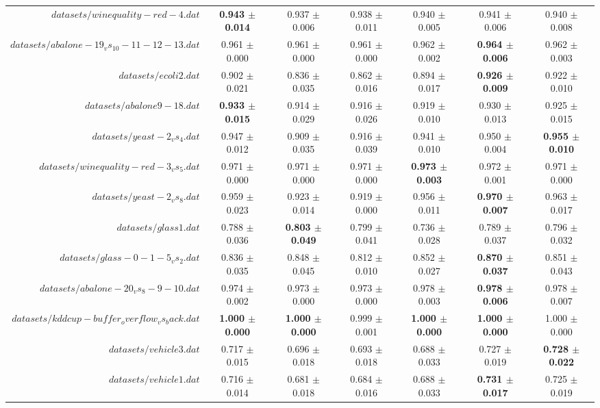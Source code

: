 \begin{table}[!ht]
{\begin{tabular}{r c c c c c c}
$datasets/winequality-red-4.dat$ & \textbf{0.943 $\pm$ 0.014} & 0.937 $\pm$ 0.006 & 0.938 $\pm$ 0.011 & 0.940 $\pm$ 0.005 & 0.941 $\pm$ 0.006 & 0.940 $\pm$ 0.008 \\
$datasets/abalone-19_vs_10-11-12-13.dat$ & 0.961 $\pm$ 0.000 & 0.961 $\pm$ 0.000 & 0.961 $\pm$ 0.000 & 0.962 $\pm$ 0.002 & \textbf{0.964 $\pm$ 0.006} & 0.962 $\pm$ 0.003 \\
$datasets/ecoli2.dat$ & 0.902 $\pm$ 0.021 & 0.836 $\pm$ 0.035 & 0.862 $\pm$ 0.016 & 0.894 $\pm$ 0.017 & \textbf{0.926 $\pm$ 0.009} & 0.922 $\pm$ 0.010 \\
$datasets/abalone9-18.dat$ & \textbf{0.933 $\pm$ 0.015} & 0.914 $\pm$ 0.029 & 0.916 $\pm$ 0.026 & 0.919 $\pm$ 0.010 & 0.930 $\pm$ 0.013 & 0.925 $\pm$ 0.015 \\
$datasets/yeast-2_vs_4.dat$ & 0.947 $\pm$ 0.012 & 0.909 $\pm$ 0.035 & 0.916 $\pm$ 0.039 & 0.941 $\pm$ 0.010 & 0.950 $\pm$ 0.004 & \textbf{0.955 $\pm$ 0.010} \\
$datasets/winequality-red-3_vs_5.dat$ & 0.971 $\pm$ 0.000 & 0.971 $\pm$ 0.000 & 0.971 $\pm$ 0.000 & \textbf{0.973 $\pm$ 0.003} & 0.972 $\pm$ 0.001 & 0.971 $\pm$ 0.000 \\
$datasets/yeast-2_vs_8.dat$ & 0.959 $\pm$ 0.023 & 0.923 $\pm$ 0.014 & 0.919 $\pm$ 0.000 & 0.956 $\pm$ 0.011 & \textbf{0.970 $\pm$ 0.007} & 0.963 $\pm$ 0.017 \\
$datasets/glass1.dat$ & 0.788 $\pm$ 0.036 & \textbf{0.803 $\pm$ 0.049} & 0.799 $\pm$ 0.041 & 0.736 $\pm$ 0.028 & 0.789 $\pm$ 0.037 & 0.796 $\pm$ 0.032 \\
$datasets/glass-0-1-5_vs_2.dat$ & 0.836 $\pm$ 0.035 & 0.848 $\pm$ 0.045 & 0.812 $\pm$ 0.010 & 0.852 $\pm$ 0.027 & \textbf{0.870 $\pm$ 0.037} & 0.851 $\pm$ 0.043 \\
$datasets/abalone-20_vs_8-9-10.dat$ & 0.974 $\pm$ 0.002 & 0.973 $\pm$ 0.000 & 0.973 $\pm$ 0.000 & 0.978 $\pm$ 0.003 & \textbf{0.978 $\pm$ 0.006} & 0.978 $\pm$ 0.007 \\
$datasets/kddcup-buffer_overflow_vs_back.dat$ & \textbf{1.000 $\pm$ 0.000} & \textbf{1.000 $\pm$ 0.000} & 0.999 $\pm$ 0.001 & \textbf{1.000 $\pm$ 0.000} & \textbf{1.000 $\pm$ 0.000} & 1.000 $\pm$ 0.000 \\
$datasets/vehicle3.dat$ & 0.717 $\pm$ 0.015 & 0.696 $\pm$ 0.018 & 0.693 $\pm$ 0.018 & 0.688 $\pm$ 0.033 & 0.727 $\pm$ 0.019 & \textbf{0.728 $\pm$ 0.022} \\
$datasets/vehicle1.dat$ & 0.716 $\pm$ 0.014 & 0.681 $\pm$ 0.018 & 0.684 $\pm$ 0.016 & 0.688 $\pm$ 0.033 & \textbf{0.731 $\pm$ 0.017} & 0.725 $\pm$ 0.019 \\

\end{tabular}}
\end{table}
